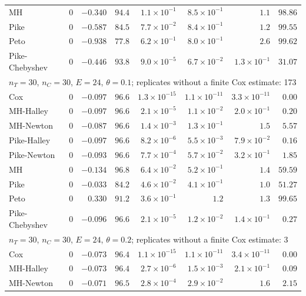 \begin{landscape}
\begin{longtable}{lrrrrrrr}
MH & 0 & $-0.340$ & $94.4$ & $1.1 \times 10^{-1}$ & $8.5 \times 10^{-1}$ & $1.1$ & $98.86$ \\
Pike & 0 & $-0.587$ & $84.5$ & $7.7 \times 10^{-2}$ & $8.4 \times 10^{-1}$ & $1.2$ & $99.55$ \\
Peto & 0 & $-0.938$ & $77.8$ & $6.2 \times 10^{-1}$ & $8.0 \times 10^{-1}$ & $2.6$ & $99.62$ \\
Pike-Chebyshev & 0 & $-0.446$ & $93.8$ & $9.0 \times 10^{-5}$ & $6.7 \times 10^{-2}$ & $1.3 \times 10^{-1}$ & $31.07$ \\
\multicolumn{8}{l}{$n_T = 30$, $n_C = 30$, $E = 24$, $\theta = 0.1$; replicates without a finite Cox estimate: 173} \\
Cox & 0 & $-0.097$ & $96.6$ & $1.3 \times 10^{-15}$ & $1.1 \times 10^{-11}$ & $3.3 \times 10^{-11}$ & $0.00$ \\
MH-Halley & 0 & $-0.097$ & $96.6$ & $2.1 \times 10^{-5}$ & $1.1 \times 10^{-2}$ & $2.0 \times 10^{-1}$ & $0.20$ \\
MH-Newton & 0 & $-0.087$ & $96.6$ & $1.4 \times 10^{-3}$ & $1.3 \times 10^{-1}$ & $1.5$ & $5.57$ \\
Pike-Halley & 0 & $-0.097$ & $96.6$ & $8.2 \times 10^{-6}$ & $5.5 \times 10^{-3}$ & $7.9 \times 10^{-2}$ & $0.16$ \\
Pike-Newton & 0 & $-0.093$ & $96.6$ & $7.7 \times 10^{-4}$ & $5.7 \times 10^{-2}$ & $3.2 \times 10^{-1}$ & $1.85$ \\
MH & 0 & $-0.134$ & $96.8$ & $6.4 \times 10^{-2}$ & $5.2 \times 10^{-1}$ & $1.4$ & $59.59$ \\
Pike & 0 & $-0.033$ & $84.2$ & $4.6 \times 10^{-2}$ & $4.1 \times 10^{-1}$ & $1.0$ & $51.27$ \\
Peto & 0 & $0.330$ & $91.2$ & $3.6 \times 10^{-1}$ & $1.2$ & $1.3$ & $99.65$ \\
Pike-Chebyshev & 0 & $-0.096$ & $96.6$ & $2.1 \times 10^{-5}$ & $1.2 \times 10^{-2}$ & $1.4 \times 10^{-1}$ & $0.27$ \\
\multicolumn{8}{l}{$n_T = 30$, $n_C = 30$, $E = 24$, $\theta = 0.2$; replicates without a finite Cox estimate: 3} \\
Cox & 0 & $-0.073$ & $96.4$ & $1.1 \times 10^{-15}$ & $1.1 \times 10^{-11}$ & $3.4 \times 10^{-11}$ & $0.00$ \\
MH-Halley & 0 & $-0.073$ & $96.4$ & $2.7 \times 10^{-6}$ & $1.5 \times 10^{-3}$ & $2.1 \times 10^{-1}$ & $0.09$ \\
MH-Newton & 0 & $-0.071$ & $96.5$ & $2.8 \times 10^{-4}$ & $2.9 \times 10^{-2}$ & $1.6$ & $2.15$ \\

\end{longtable}
\end{landscape}
